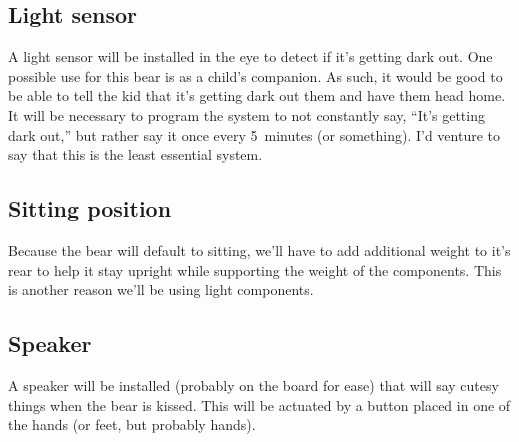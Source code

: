 \documentclass{article}
\begin{document}
\subsection{Light sensor}
A light sensor will be installed in the eye to detect if it's getting dark out. One possible use for this bear is as a child's companion. As such, it would be good to be able to tell the kid that it's getting dark out them and have them head home. It will be necessary to program the system to not constantly say, ``It's getting dark out,'' but rather say it once every 5~minutes (or something). I'd venture to say that this is the least essential system.

\subsection{Sitting position}
Because the bear will default to sitting, we'll have to add additional weight to it's rear to help it stay upright while supporting the weight of the components. This is another reason we'll be using light components.

\subsection{Speaker}
A speaker will be installed (probably on the board for ease) that will say cutesy things when the bear is kissed. This will be actuated by a button placed in one of the hands (or feet, but probably hands).

\end{document}
